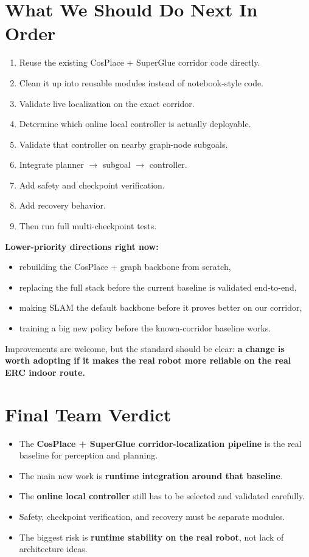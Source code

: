 \documentclass[11pt,a4paper]{article}
\begin{document}
\section{What We Should Do Next In Order}

\begin{enumerate}[nosep]
  \item Reuse the existing CosPlace + SuperGlue corridor code directly.
  \item Clean it up into reusable modules instead of notebook-style code.
  \item Validate live localization on the exact corridor.
  \item Determine which online local controller is actually deployable.
  \item Validate that controller on nearby graph-node subgoals.
  \item Integrate planner $\rightarrow$ subgoal $\rightarrow$ controller.
  \item Add safety and checkpoint verification.
  \item Add recovery behavior.
  \item Then run full multi-checkpoint tests.
\end{enumerate}

\textbf{Lower-priority directions right now:}

\begin{itemize}[nosep]
  \item rebuilding the CosPlace + graph backbone from scratch,
  \item replacing the full stack before the current baseline is validated end-to-end,
  \item making SLAM the default backbone before it proves better on our corridor,
  \item training a big new policy before the known-corridor baseline works.
\end{itemize}

Improvements are welcome, but the standard should be clear:
\textbf{a change is worth adopting if it makes the real robot more reliable on the real ERC indoor route.}


\section{Final Team Verdict}

\begin{mdframed}
\begin{itemize}[nosep]
  \item The \textbf{CosPlace + SuperGlue corridor-localization pipeline} is the real baseline for perception and planning.
  \item The main new work is \textbf{runtime integration around that baseline}.
  \item The \textbf{online local controller} still has to be selected and validated carefully.
  \item Safety, checkpoint verification, and recovery must be separate modules.
  \item The biggest risk is \textbf{runtime stability on the real robot}, not lack of architecture ideas.
\end{itemize}
\end{mdframed}
\end{document}
